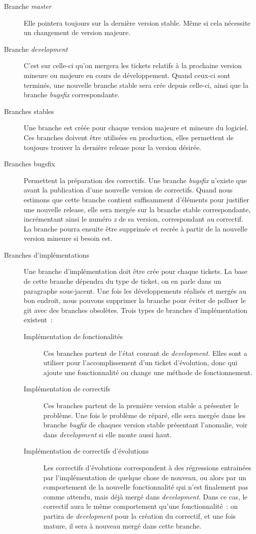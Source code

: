 \begin{description}
	\item[Branche \emph{master}]
		Elle pointera toujours sur la dernière version stable.
		Même si cela nécessite un changement de version majeure.
	\item[Branche \emph{development}]
		C'est sur celle-ci qu'on mergera les tickets relatifs à la prochaine version mineure ou majeure en cours de développement.
		Quand ceux-ci sont terminés, une nouvelle branche stable sera crée depuis celle-ci, ainsi que la branche \emph{bugsfix} correspondante.
	\item[Branches stables]
		Une branche est créée pour chaque version majeure et mineure du logiciel. Ces branches doivent être utilisées en production, elles permettent de toujours trouver la dernière release pour la version désirée.
	\item[Branches bugsfix]
		Permettent la préparation des correctifs.
		Une branche \emph{bugsfix} n'existe que avant la publication d'une nouvelle version de correctifs.
		Quand nous estimons que cette branche contient suffisamment d'éléments pour justifier une nouvelle release, elle sera mergée sur la branche stable correspondante, incrémentant ainsi le numéro \emph{z} de sa version, correspondant au correctif.
		La branche pourra ensuite être supprimée et recrée à partir de la nouvelle version mineure si besoin est.
	\item[Branches d'implémentations]
		Une branche d'implémentation doit être crée pour chaque tickets.
		La base de cette branche dépendra du type de ticket, on en parle dans un paragraphe sous-jacent.
		Une fois les développements réalisés et mergés au bon endroit, nous pouvons supprimer la branche pour éviter de polluer le git avec des branches obsolètes.
		Trois types de branches d'implémentation existent~:
		\begin{description}
			\item[Implémentation de fonctionalités]
				Ces branches partent de l'état courant de \emph{development}.
				Elles sont a utiliser pour l'accomplissement d'un ticket d'évolution, donc qui ajoute une fonctionnalité ou change une méthode de fonctionnement.
			\item[Implémentation de correctifs]
				Ces branches partent de la première version stable a présenter le problème.
				Une fois le problème de réparé, elle sera mergée dans les branche \emph{bugfix} de chaques version stable présentant l'anomalie, voir dans \emph{development} si elle monte aussi haut.
			\item[Implémentation de correctifs d'évolutions]
				Les correctifs d'évolutions correspondent à des régressions entrainées par l'implémentation de quelque chose de nouveau, ou alors par un comportement de la nouvelle fonctionnalité qui n'est finalement pas comme attendu, mais déjà mergé dans \emph{development}.
				Dans ce cas, le correctif aura le même comportement qu'une fonctionnalité~: on partira de \emph{development} pour la création du correctif, et une fois mature, il sera à nouveau mergé dans cette branche.
		\end{description}
\end{description}

